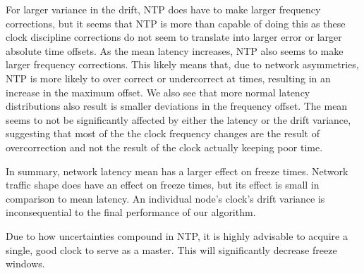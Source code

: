 For larger variance in the drift, NTP does have to make larger
frequency corrections, but it seems that NTP is more than capable of
doing this as these clock discipline corrections do not seem to
translate into larger error or larger absolute time offsets. As the
mean latency increases, NTP also seems to make larger frequency
corrections. This likely means that, due to network asymmetries, NTP
is more likely to over correct or undercorrect at times, resulting in
an increase in the maximum offset. We also see that more normal
latency distributions also result is smaller deviations in the
frequency offset. The mean seems to not be significantly affected by
either the latency or the drift variance, suggesting that most of the
the clock frequency changes are the result of overcorrection and not
the result of the clock actually keeping poor time.

In summary, network latency mean has a larger effect on freeze
times. Network traffic shape does have an effect on freeze times, but
its effect is small in comparison to mean latency. An individual
node's clock's drift variance is inconsequential to the final
performance of our algorithm.

Due to how uncertainties compound in NTP, it is highly advisable to
acquire a single, good clock to serve as a master. This will
significantly decrease freeze windows.

